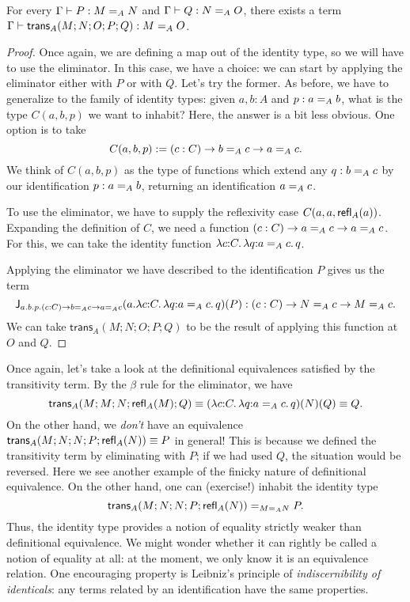 \documentclass{article}
\newcommand{\Idtrans}[6]{\mathsf{trans}_{#1}(#2;#3;#4;#5;#6)}
\begin{document}
\begin{lemma}
  For every $\hasEF{\Gamma}{P}{\Ideq{A}{M}{N}}$ and
  $\hasEF{\Gamma}{Q}{\Ideq{A}{N}{O}}$, there exists a term
  $\hasEF{\Gamma}{\Idtrans{A}{M}{N}{O}{P}{Q}}{\Ideq{A}{M}{O}}$.
\end{lemma}
\begin{proof}
  Once again, we are defining a map out of the identity type, so we will have to
  use the eliminator. In this case, we have a choice: we can start by applying
  the eliminator either with $P$ or with $Q$. Let's try the former. As before,
  we have to generalize to the family of identity types: given $a,b : A$ and
  $p : \Ideq{A}{a}{b}$, what is the type $C(a,b,p)$ we want to inhabit? Here, the
  answer is a bit less obvious. One option is to take
  \[
    C(a,b,p) \eqdef \Pitype{c}{C}{\Ideq{A}{b}{c} \to \Ideq{A}{a}{c}}.
  \]
  We think of $C(a,b,p)$ as the type of functions which extend any
  $q : \Ideq{A}{b}{c}$ by our identification $p : \Ideq{A}{a}{b}$, returning an
  identification $\Ideq{A}{a}{c}$.

  To use the eliminator, we have to supply the reflexivity case
  $C(a,a,\refl[A]{a})$. Expanding the definition of $C$, we need a function
  $\Pitype{c}{C}{\Ideq{A}{a}{c} \to \Ideq{A}{a}{c}}$. For this, we can take the
  identity function $\lam{c}{C}{\lam{q}{\Ideq{A}{a}{c}}{q}}$.

  Applying the eliminator we have described to the identification $P$ gives us
  the term
  \[
    \hasEF{\Idelim{a.b.p.\Pitype{c}{C}{\Ideq{A}{b}{c} \to \Ideq{A}{a}{c}}}{a.\lam{c}{C}{\lam{q}{\Ideq{A}{a}{c}}{q}}}{P}}{\Pitype{c}{C}{\Ideq{A}{N}{c} \to \Ideq{A}{M}{c}}}.
  \]
  We can take $\Idtrans{A}{M}{N}{O}{P}{Q}$ to be the result of applying this
  function at $O$ and $Q$.
\end{proof}

Once again, let's take a look at the definitional equivalences satisfied by the
transitivity term. By the $\beta$ rule for the eliminator, we have
\[
  \Idtrans{A}{M}{M}{N}{\refl[A]{M}}{Q} \equiv
  (\lam{c}{C}{\lam{q}{\Ideq{A}{a}{c}}{q}})(N)(Q) \equiv
  Q.
\]
On the other hand, we \emph{don't} have an equivalence
$\Idtrans{A}{M}{N}{N}{P}{\refl[A]{N}} \equiv P$ in general! This is because we
defined the transitivity term by eliminating with $P$; if we had used $Q$, the
situation would be reversed. Here we see another example of the finicky nature
of definitional equivalence. On the other hand, one can (exercise!) inhabit the
identity type
\[
  \Ideq{\Ideq{A}{M}{N}}{\Idtrans{A}{M}{N}{N}{P}{\refl[A]{N}}}{P}.
\]
Thus, the identity type provides a notion of equality strictly weaker than
definitional equivalence. We might wonder whether it can rightly be called a
notion of equality at all: at the moment, we only know it is an equivalence
relation. One encouraging property is Leibniz's principle of
\emph{indiscernibility of identicals}: any terms related by an identification
have the same properties.
\end{document}

